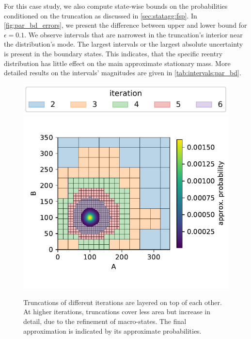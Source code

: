 For this case study, we also compute state-wise bounds on the probabilities conditioned on the truncation as discussed in \autoref{sec:statagg:fsp}.
In \autoref{fig:par_bd_errors}, we present the difference between upper and lower bound for $\epsilon=0.1$.
We observe intervals that are narrowest in the truncation's interior near the distribution's mode.
The largest intervals or the largest absolute uncertainty is present in the boundary states.
This indicates, that the specific reentry distribution has little effect on the main approximate stationary mass.
More detailed results on the intervals' magnitudes are given in \autoref{tab:intervals:par_bd}.
\begin{figure}[htb]
    \centering
    \includegraphics[scale=0.7]{gfx/iteration_legend.pdf}\\
    \vspace{-5mm}
    \includegraphics[width=.75\textwidth]{gfx/parbd_truncs.pdf}
	\caption[Overview of truncation refinements]{\label{fig:par_bd}Truncations of different iterations are layered on top of each other. At higher iterations, truncations cover less area but increase in detail, due to the refinement of macro-states. The final approximation is indicated by its approximate probabilities.}
\end{figure}
